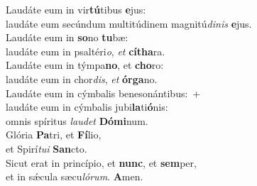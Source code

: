 \evenverse Laudáte eum in vir\textbf{tú}tibus \textbf{e}jus:~\*\\
\evenverse laudáte eum secúndum multitúdinem magnitú\textit{di}\textit{nis} \textbf{e}jus.\\
\oddverse Laudáte eum in \textbf{so}no \textbf{tu}bæ:~\*\\
\oddverse laudáte eum in psaltéri\textit{o}, \textit{et} \textbf{cí}\textbf{tha}ra.\\
\evenverse Laudáte eum in týmpa\textbf{no}, et \textbf{cho}ro:~\*\\
\evenverse laudáte eum in chor\textit{dis}, \textit{et} \textbf{ór}\textbf{ga}no.\\
\oddverse Laudáte eum in cýmbalis benesonántibus:~+\\
\oddverse  laudáte eum in cýmbalis jubi\textbf{la}ti\textbf{ó}nis:~\*\\
\oddverse omnis spíritus \textit{lau}\textit{det} \textbf{Dó}\textbf{mi}num.\\
\evenverse Glória \textbf{Pa}tri, et \textbf{Fí}lio,~\*\\
\evenverse et Spirí\textit{tu}\textit{i} \textbf{San}cto.\\
\oddverse Sicut erat in princípio, et \textbf{nunc}, et \textbf{sem}per,~\*\\
\oddverse et in sǽcula sæcu\textit{ló}\textit{rum}. \textbf{A}men.\\
